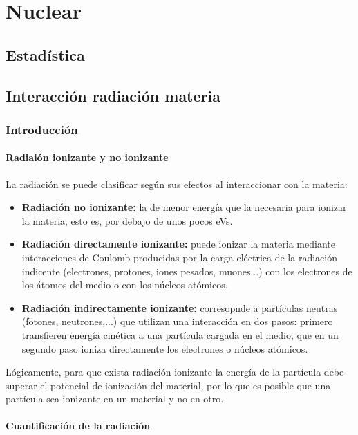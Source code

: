 

\chapter{Nuclear}

\section{Estadística}

\section{Interacción radiación materia}

\subsection{Introducción}

\subsubsection{Radiaión ionizante y no ionizante}

La radiación se puede clasificar según sus efectos al interaccionar con la materia:

\begin{itemize}
    \item \textbf{Radiación no ionizante:} la de menor energía que la necesaria para ionizar la materia, esto es, por debajo de unos pocos eVs.
    \item \textbf{Radiación directamente ionizante:} puede ionizar la materia mediante interacciones de Coulomb producidas por la carga eléctrica de la radiación indicente (electrones, protones, iones pesados, muones...) con los electrones de los átomos del medio o con los núcleos atómicos.
    \item \textbf{Radiación indirectamente ionizante:} corresopnde a partículas neutras (fotones, neutrones,...) que utilizan una interacción en dos pasos: primero transfieren energía cinética a una partícula cargada en el medio, que en un segundo paso ioniza directamente los electrones o núcleos atómicos.
\end{itemize}
Lógicamente, para que exista radiación ionizante la energía de la partícula debe superar el potencial de ionización del material, por lo que es posible que una partícula sea ionizante en un material y no en otro.

\subsubsection{Cuantificación de la radiación}

